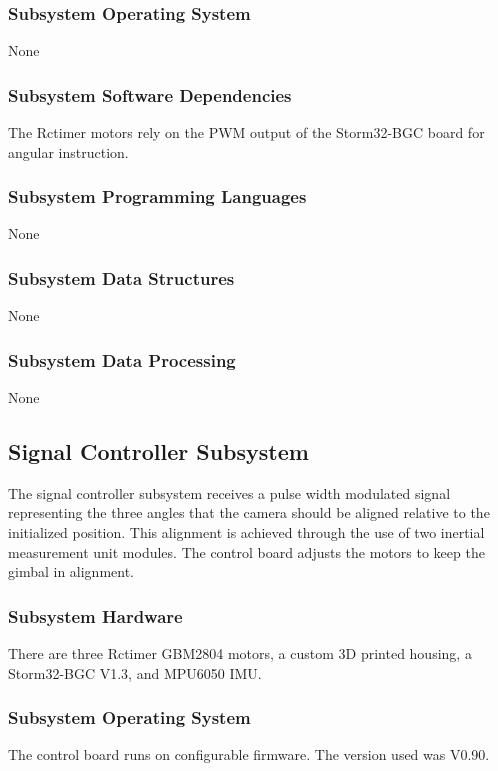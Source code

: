 \subsubsection{Subsystem Operating System}
None

\subsubsection{Subsystem Software Dependencies}
The Rctimer motors rely on the PWM output of the Storm32-BGC board for angular instruction.

\subsubsection{Subsystem Programming Languages}
None

\subsubsection{Subsystem Data Structures}
None

\subsubsection{Subsystem Data Processing}
None

\subsection{Signal Controller Subsystem}
The signal controller subsystem receives a pulse width modulated signal representing the three angles that the camera should be aligned relative to the initialized position. This alignment is achieved through the use of two inertial measurement unit modules. The control board adjusts the motors to keep the gimbal in alignment.

\subsubsection{Subsystem Hardware}
There are three Rctimer GBM2804 motors, a custom 3D printed housing, a Storm32-BGC V1.3, and MPU6050 IMU.

\subsubsection{Subsystem Operating System}
The control board runs on configurable firmware. The version used was V0.90.

